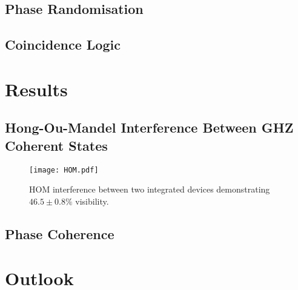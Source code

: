 \subsection{Phase Randomisation}

\subsection{Coincidence Logic}

\section{Results}

\subsection{Hong-Ou-Mandel Interference Between GHZ Coherent States}

\begin{figure}[tbp]
	\centering
	\texttt{[image: HOM.pdf]}
	\caption[Hong-Ou-Mandel interference between integrated devices]{\ac{HOM} interference between two integrated devices demonstrating $46.5\pm0.8\%$ visibility.}
	\label{fig:HOM}
\end{figure}

\subsection{Phase Coherence}

\section{Outlook}

